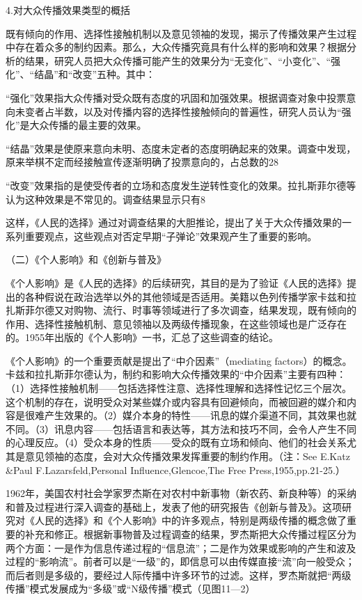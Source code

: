 \documentclass[UTF8,12pt]{ctexart}
\numberwithin{equation}{section} %
\numberwithin{figure}{section}
\numberwithin{table}{section}
\begin{document}
	4.对大众传播效果类型的概括
	
	既有倾向的作用、选择性接触机制以及意见领袖的发现，揭示了传播效果产生过程中存在着众多的制约因素。那么，大众传播究竟具有什么样的影响和效果？根据分析的结果，研究人员把大众传播可能产生的效果分为“无变化”、“小变化”、“强化”、“结晶”和“改变”五种。其中：
	
	“强化”效果指大众传播对受众既有态度的巩固和加强效果。根据调查对象中投票意向未变者占半数，以及对传播内容的选择性接触倾向的普遍性，研究人员认为“强化”是大众传播的最主要的效果。
	
	“结晶”效果是使原来意向未明、态度未定者的态度明确起来的效果。调查中发现，原来举棋不定而经接触宣传逐渐明确了投票意向的，占总数的28%
	
	“改变”效果指的是使受传者的立场和态度发生逆转性变化的效果。拉扎斯菲尔德等认为这种效果是不常见的。调查结果显示只有8%
	
	这样，《人民的选择》通过对调查结果的大胆推论，提出了关于大众传播效果的一系列重要观点，这些观点对否定早期“子弹论”效果观产生了重要的影响。
	
	（二）《个人影响》和《创新与普及》
	
	《个人影响》是《人民的选择》的后续研究，其目的是为了验证《人民的选择》提出的各种假说在政治选举以外的其他领域是否适用。美籍以色列传播学家卡兹和拉扎斯菲尔德又对购物、流行、时事等领域进行了多次调查，结果发现，既有倾向的作用、选择性接触机制、意见领袖以及两级传播现象，在这些领域也是广泛存在的。1955年出版的《个人影响》一书，汇总了这些调查的结论。
	
	《个人影响》的一个重要贡献是提出了“中介因素”（mediating factors）的概念。卡兹和拉扎斯菲尔德认为，制约和影响大众传播效果的“中介因素”主要有四种：（1）选择性接触机制——包括选择性注意、选择性理解和选择性记忆三个层次。这个机制的存在，说明受众对某些媒介或内容具有回避倾向，而被回避的媒介和内容是很难产生效果的。（2）媒介本身的特性——讯息的媒介渠道不同，其效果也就不同。（3）讯息内容——包括语言和表达等，其方法和技巧不同，会令人产生不同的心理反应。（4）受众本身的性质——受众的既有立场和倾向、他们的社会关系尤其是意见领袖的态度，会对大众传播效果发挥重要的制约作用。（注：See E.Katz \&Paul F.Lazarsfeld,Personal Influence,Glencoe,The Free Press,1955,pp.21-25.）
	
	1962年，美国农村社会学家罗杰斯在对农村中新事物（新农药、新良种等）的采纳和普及过程进行深入调查的基础上，发表了他的研究报告《创新与普及》。这项研究对《人民的选择》和《个人影响》中的许多观点，特别是两级传播的概念做了重要的补充和修正。根据新事物普及过程调查的结果，罗杰斯把大众传播过程区分为两个方面：一是作为信息传递过程的“信息流”；二是作为效果或影响的产生和波及过程的“影响流”。前者可以是“一级”的，即信息可以由传媒直接“流”向一般受众；而后者则是多级的，要经过人际传播中许多环节的过滤。这样，罗杰斯就把“两级传播”模式发展成为“多级”或“N级传播”模式（见图11—2）
	
\end{document}
